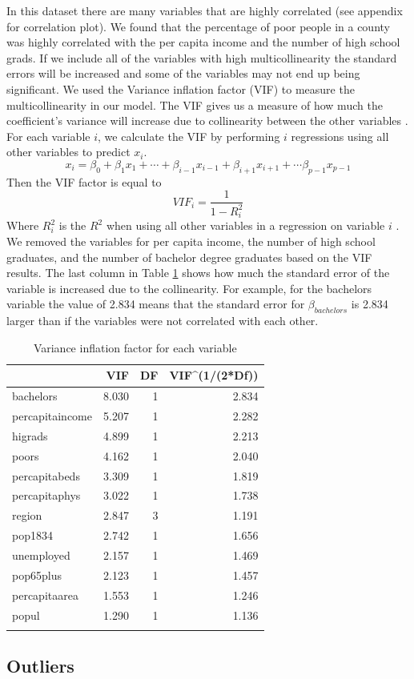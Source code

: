 \documentclass[]{article}
\begin{document}
In this dataset there are many variables that are highly correlated (see
appendix for correlation plot). We found that the percentage of poor
people in a county was highly correlated with the per capita income and
the number of high school grads. If we include all of the variables with
high multicollinearity the standard errors will be increased and some of
the variables may not end up being significant. We used the Variance
inflation factor (VIF) to measure the multicollinearity in our model.
The VIF gives us
a measure of how much the coefficient's variance will increase due to
collinearity between the other variables \cite{isl}. For each variable $i$, we calculate the VIF by performing $i$ regressions using all other variables to predict $x_i$.
$$
x_i = \beta_0 + \beta_1 x_1 + \cdots + \beta_{i - 1} x_{i - 1} + \beta_{i + 1} x_{i + 1} + \cdots \beta_{p-1} x_{p-1}
$$
Then the VIF factor is equal to 
$$
VIF_i = \frac{1}{1 - R_i^2}
$$
Where $R_i^2$ is the $R^2$ when using all other variables in a regression on variable $i$ \cite{wiki:vif}. We removed the variables for per capita income, the number of high
school graduates, and the number of bachelor degree graduates based on
the VIF results. The last column in Table \ref{table:vif} shows how much the
standard error of the variable is increased due to the collinearity. For
example, for the bachelors variable the value of 2.834 means that the
standard error for \(\beta_{bachelors}\) is 2.834 larger than if the
variables were not correlated with each other.

\begin{longtable}[]{@{}lrrr@{}}
\caption{Variance inflation factor for each variable}\tabularnewline
\toprule
& VIF & DF & VIF\^{}(1/(2*Df))\tabularnewline
\midrule
\endhead
bachelors & 8.030 & 1 & 2.834\tabularnewline
percapitaincome & 5.207 & 1 & 2.282\tabularnewline
higrads & 4.899 & 1 & 2.213\tabularnewline
poors & 4.162 & 1 & 2.040\tabularnewline
percapitabeds & 3.309 & 1 & 1.819\tabularnewline
percapitaphys & 3.022 & 1 & 1.738\tabularnewline
region & 2.847 & 3 & 1.191\tabularnewline
pop1834 & 2.742 & 1 & 1.656\tabularnewline
unemployed & 2.157 & 1 & 1.469\tabularnewline
pop65plus & 2.123 & 1 & 1.457\tabularnewline
percapitaarea & 1.553 & 1 & 1.246\tabularnewline
popul & 1.290 & 1 & 1.136\tabularnewline
\bottomrule
\label{table:vif}
\end{longtable}

\subsection{Outliers}\label{outliers}
\end{document}
